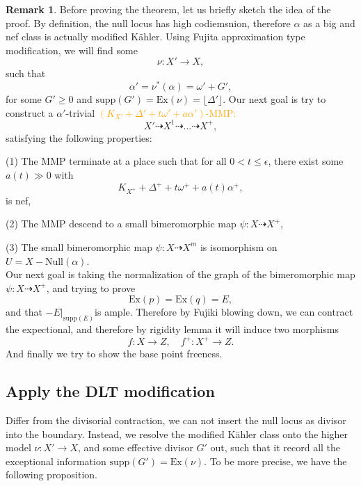 \documentclass[11pt]{article}
\theoremstyle{definition}
\newtheorem{remark}[theorem]{Remark}
\begin{document}
	\begin{remark}
		Before proving the theorem, let us briefly sketch the idea of the proof. By definition, the null locus has high codiemsnion, therefore $\alpha$ as a big and nef class is actually modified K\"ahler. Using Fujita approximation type modification, we will find some $$\nu: X' \to X,$$such that $$\alpha ' = \nu^* (\alpha ) = \omega ' + G',$$for some $G'\ge 0$ and $\text{supp}(G') = \text{Ex}(\nu) = \lfloor{\Delta'}\rfloor$. Our next goal is try to construct a $\alpha'$-trivial \textcolor{orange}{$(K_{X'}+\Delta' +  t\omega' + a \alpha')$-MMP:} $$X' \dashrightarrow X^1  \dashrightarrow ... \dashrightarrow X^+,$$
		satisfying the following properties:
		
		(1) The MMP terminate at a place such that for all $0<t\le \epsilon$, there exist some $a(t) \gg 0$ with $$K_{X^+} + \Delta^++ t \omega^+ + a(t) \alpha^+,$$
		is nef,
		
		(2) The MMP descend to a small bimeromorphic map $\psi: X \dashrightarrow X^+$,
		
		(3) The small bimeromorphic map $\psi: X \dashrightarrow X^m$ is isomorphism on $U = X - \text{Null}(\alpha)$.\\
		
		Our next goal is taking the normalization of the graph of the bimeromorphic map $\psi : X \dashrightarrow X^+$, and trying to prove $$\text{Ex}(p) = \text{Ex}(q) = E,$$ and that $-E |_{\text{supp}(E)}$is ample. Therefore by Fujiki blowing down, we can contract the expectional, and therefore by rigidity lemma it will induce two morphisms $$f: X \to Z,\quad f^+ : X^+ \to Z.$$
		And finally we try to show the base point freeness. 
		
	\end{remark}
	
	
	\subsection{Apply the DLT modification}
	Differ from the divisorial contraction, we can not insert the null locus as divisor into the boundary. Instead, we resolve the modified K\"ahler class onto the higher model $\nu:X '\to X$, and some effective divisor $G'$ out, such that it record all the exceptional information $\text{supp}(G') = \text{Ex}(\nu)$. To be more precise, we have the following proposition.
	
\end{document}
